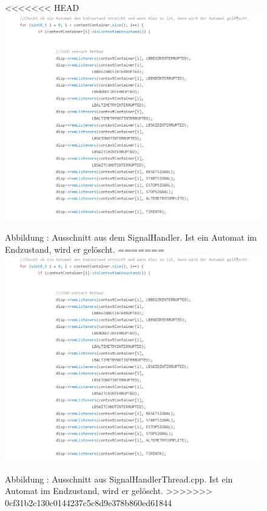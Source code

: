 \documentclass[a4paper, 11pt]{article}
\begin{document}
\newpage

\begin{figure}[H]
\centering 
<<<<<<< HEAD
    \includegraphics[scale=0.7]{ISR/dellist.png}
    
    \small Abbildung \theimgcounter : Ausschnitt aus dem SignalHandler. Ist ein Automat im Endzustand, wird er gelöscht.
=======
    \includegraphics[scale=0.6]{ISR/dellist.png}
    
    \small Abbildung \theimgcounter : Ausschnitt aus SignalHandlerThread.cpp. Ist ein Automat im Endzustand, wird er gelöscht.
>>>>>>> 0cf31b2c130c0144237c5c8d9e378b860ed61844
    \label{dellist}
\end{figure}
\end{document}
